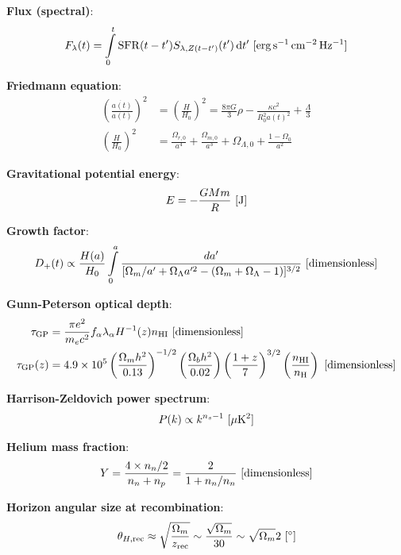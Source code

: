 \documentclass[a4paper,11pt]{article}
\begin{document}
{\noindent}\textbf{Flux (spectral)}:
\begin{align*}
    F_\lambda(t) = \int\limits_0^t \mathrm{SFR}(t-t')S_{\lambda,Z(t-t')}(t')\,\mathrm{d}t' ~ [{\rm erg\,s^{-1}\,cm^{-2}\,Hz^{-1}}]
\end{align*}

{\noindent}\textbf{Friedmann equation}:
\begin{align*}
    \left(\frac{\dot{a(t)}}{a(t)}\right)^2 &=  \left(\frac{H}{H_0}\right)^2 = \frac{8\pi G}{3}\rho - \frac{\kappa c^2}{R_0^2a(t)^2} + \frac{\Lambda}{3} \\
    \left(\frac{H}{H_0}\right)^2 &= \frac{\Omega_{r,0}}{a^4} + \frac{\Omega_{m,0}}{a^3} + \Omega_{\Lambda,0} + \frac{1-\Omega_0}{a^2}
\end{align*}

{\noindent}\textbf{Gravitational potential energy}:
\begin{align*}
    E = -\frac{GMm}{R} ~ [{\rm J}]
\end{align*}

{\noindent}\textbf{Growth factor}:
\begin{align*}
    D_+(t) \propto \frac{H(a)}{H_0}\int\limits_0^a \frac{da'}{[\Omega_m/a'+\Omega_\Lambda a'^2-(\Omega_m+\Omega_\Lambda-1)]^{3/2}} ~ [{\rm dimensionless}]
\end{align*}

{\noindent}\textbf{Gunn-Peterson optical depth}:
\begin{align*}
    \tau_\mathrm{GP} &= \frac{\pi e^2}{m_ec^2}f_\alpha\lambda_\alpha H^{-1}(z)n_\mathrm{HI} ~ [{\rm dimensionless}] \\
    \tau_\mathrm{GP}(z) &= 4.9\times10^5 \left(\frac{\Omega_mh^2}{0.13}\right)^{-1/2} \left(\frac{\Omega_bh^2}{0.02}\right) \left(\frac{1+z}{7}\right)^{3/2} \left(\frac{n_\mathrm{HI}}{n_\mathrm{H}}\right) ~ [{\rm dimensionless}]
\end{align*}

{\noindent}\textbf{Harrison-Zeldovich power spectrum}:
\begin{align*}
    P(k) \propto k^{n_s-1} ~ [{\rm \mu K^2}]
\end{align*}

{\noindent}\textbf{Helium mass fraction}:
\begin{align*}
    Y = \frac{4\times n_n/2}{n_n + n_p}  = \frac{2}{1 + n_n/n_n} ~ [{\rm dimensionless}]
\end{align*}

{\noindent}\textbf{Horizon angular size at recombination}:
\begin{align*}
    \theta_{H,\mathrm{rec}} \approx \sqrt{\frac{\Omega_m}{z_\mathrm{rec}}} \sim \frac{\sqrt{\Omega_m}}{30} \sim \sqrt{\Omega_m}2 ~ [{\rm ^\circ}]
\end{align*}
\end{document}
